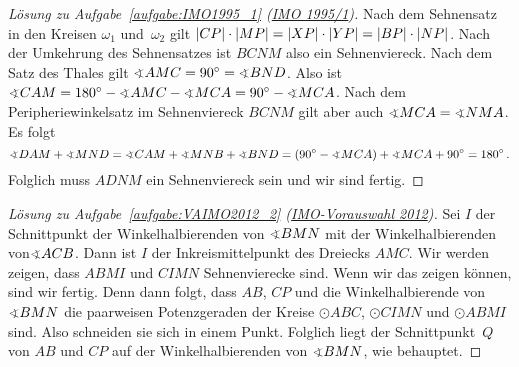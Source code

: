 \begin{proof}[Lösung zu Aufgabe~\ref{aufgabe:IMO1995_1} \textmd{(\href{https://artofproblemsolving.com/community/c3822_1995_imo}{IMO 1995/1})}]
	Nach dem Sehnensatz in den Kreisen $\omega_1$ und~$\omega_2$ gilt $\abs*{CP}\cdot \abs*{MP}=\abs*{XP}\cdot \abs*{YP}=\abs*{BP}\cdot \abs{NP}$. Nach der Umkehrung des Sehnensatzes ist $BCNM$ also ein Sehnenviereck. Nach dem Satz des Thales gilt $\winkel AMC=90^\circ=\winkel BND$. Also ist $\winkel CAM=180^\circ-\winkel AMC-\winkel MCA=90^\circ-\winkel MCA$. Nach dem Peripheriewinkelsatz im Sehnenviereck $BCNM$ gilt aber auch $\winkel MCA=\winkel NMA$. Es folgt
	\begin{equation*}
		\winkel DAM+\winkel MND=\winkel CAM+\winkel MNB+\winkel BND=\parens*{90^\circ-\winkel MCA}+\winkel MCA+90^\circ=180^\circ\,.
	\end{equation*}
	Folglich muss $ADNM$ ein Sehnenviereck sein und wir sind fertig.
\end{proof}
\begin{proof}[Lösung zu Aufgabe~\ref{aufgabe:VAIMO2012_2} \textmd{(\href{https://www.mathe-wettbewerbe.de/fileadmin/Mathe-Wettbewerbe/AIMO/Aufgaben_und_Loesungen_AIMO/aufgaben_awb_12.pdf}{IMO-Vorauswahl 2012})}]
	Sei $I$ der Schnittpunkt der Winkelhalbierenden von $\winkel BMN$ mit der Winkelhalbierenden von$ \winkel ACB$. Dann ist $I$ der Inkreismittelpunkt des Dreiecks $AMC$. Wir werden zeigen, dass $ABMI$ und $CIMN$ Sehnenvierecke sind. Wenn wir das zeigen können, sind wir fertig. Denn dann folgt, dass $AB$, $CP$ und die Winkelhalbierende von $\winkel BMN$ die paarweisen Potenzgeraden der Kreise $\odot ABC$, $\odot CIMN$ und $\odot ABMI$ sind. Also schneiden sie sich in einem Punkt. Folglich liegt der Schnittpunkt~$Q$ von $AB$ und $CP$ auf der Winkelhalbierenden von $\winkel BMN$, wie behauptet.
	

\end{proof}
